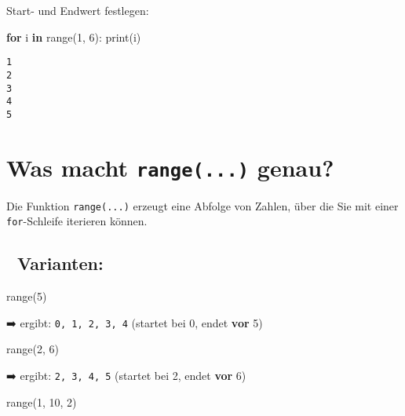 \documentclass[
  letterpaper,
  DIV=11,
  numbers=noendperiod]{scrreprt}
\newenvironment{Shaded}{\begin{snugshade}}{\end{snugshade}}
\newcommand{\BuiltInTok}[1]{\textcolor[rgb]{0.00,0.23,0.31}{#1}}
\newcommand{\ControlFlowTok}[1]{\textcolor[rgb]{0.00,0.23,0.31}{\textbf{#1}}}
\newcommand{\DecValTok}[1]{\textcolor[rgb]{0.68,0.00,0.00}{#1}}
\newcommand{\KeywordTok}[1]{\textcolor[rgb]{0.00,0.23,0.31}{\textbf{#1}}}
\newcommand{\NormalTok}[1]{\textcolor[rgb]{0.00,0.23,0.31}{#1}}
\begin{document}
Start- und Endwert festlegen:

\begin{Shaded}
\begin{Highlighting}[]
\ControlFlowTok{for}\NormalTok{ i }\KeywordTok{in} \BuiltInTok{range}\NormalTok{(}\DecValTok{1}\NormalTok{, }\DecValTok{6}\NormalTok{):}
    \BuiltInTok{print}\NormalTok{(i)}
\end{Highlighting}
\end{Shaded}

\begin{verbatim}
1
2
3
4
5
\end{verbatim}

\section{\texorpdfstring{Was macht \texttt{range(...)}
genau?}{Was macht range(...) genau?}}\label{was-macht-range...-genau}

Die Funktion \texttt{range(...)} erzeugt eine Abfolge von Zahlen, über
die Sie mit einer \texttt{for}-Schleife iterieren können.

\subsection{🔢 Varianten:}\label{varianten}

\begin{Shaded}
\begin{Highlighting}[]
\BuiltInTok{range}\NormalTok{(}\DecValTok{5}\NormalTok{)}
\end{Highlighting}
\end{Shaded}

➡️ ergibt: \texttt{0,\ 1,\ 2,\ 3,\ 4} (startet bei 0, endet \textbf{vor}
5)

\begin{Shaded}
\begin{Highlighting}[]
\BuiltInTok{range}\NormalTok{(}\DecValTok{2}\NormalTok{, }\DecValTok{6}\NormalTok{)}
\end{Highlighting}
\end{Shaded}

➡️ ergibt: \texttt{2,\ 3,\ 4,\ 5} (startet bei 2, endet \textbf{vor} 6)

\begin{Shaded}
\begin{Highlighting}[]
\BuiltInTok{range}\NormalTok{(}\DecValTok{1}\NormalTok{, }\DecValTok{10}\NormalTok{, }\DecValTok{2}\NormalTok{)}
\end{Highlighting}
\end{Shaded}
\end{document}
